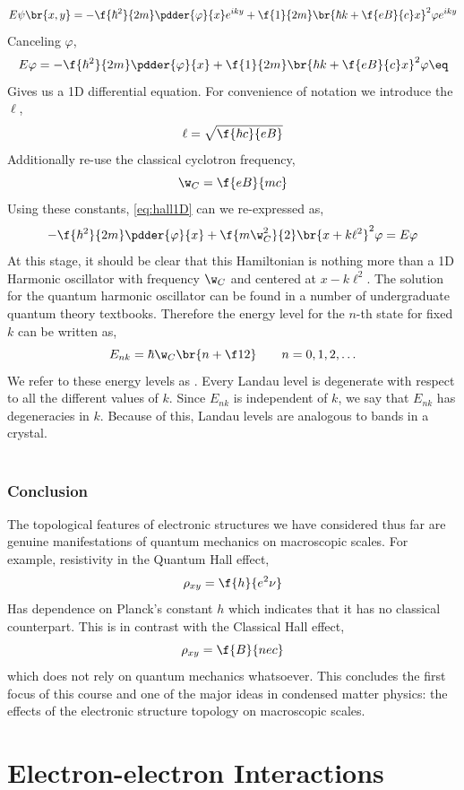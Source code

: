 \documentclass{article}
\begin{document}
\[ E \psi\br{x,y}= - \f{\hbar^2}{2m} \pdder{\varphi}{x} e^{iky} + \f{1}{2m}\br{\hbar k + \f{eB}{c}x}^2 \varphi e^{iky} \]
Canceling $\varphi$,
\[ E \varphi = - \f{\hbar^2}{2m} \pdder{\varphi}{x} + \f{1}{2m}\br{\hbar k + \f{eB}{c}x}^2 \varphi \eq \label{eq:hall1D}\]
Gives us a 1D differential equation. For convenience of notation we introduce the  $\ell$,
\[ \ell = \sqrt{\f{\hbar c}{eB}} \]
Additionally re-use the classical cyclotron frequency,
\[ \w_{C} = \f{eB}{mc} \]
Using these constants, \cref{eq:hall1D} can we re-expressed as,
\[ -\f{\hbar^2}{2m} \pdder{\varphi}{x} + \f{m\w_{C}^2}{2} \br{x + k \ell^{2}}^2 \varphi = E \varphi \]
At this stage, it should be clear that this Hamiltonian is nothing more than a 1D Harmonic oscillator with frequency $\w_{C}$ and centered at $x - k \ell^{2}$. The solution for the quantum harmonic oscillator can be found in a number of undergraduate quantum theory textbooks. Therefore the energy level for the $n$-th state for fixed $k$ can be written as,
\[ E_{nk} = \hbar \w_{C} \br{n + \f12} \qquad n = 0, 1, 2, \ldots \]
We refer to these energy levels as . Every Landau level is degenerate with respect to all the different values of $k$. Since $E_{nk}$ is independent of $k$, we say that $E_{nk}$ has degeneracies in $k$. Because of this, Landau levels are analogous to bands in a crystal. \\

 \\

\subsubsection{Conclusion}

The topological features of electronic structures we have considered thus far are genuine manifestations of quantum mechanics on macroscopic scales. For example, resistivity in the Quantum Hall effect,
\[ \rho_{xy} = \f{h}{e^2 \nu} \]
Has dependence on Planck's constant $h$ which indicates that it has no classical counterpart. This is in contrast with the Classical Hall effect,
\[ \rho_{xy} = \f{B}{nec} \]
which does not rely on quantum mechanics whatsoever. This concludes the first focus of this course and one of the major ideas in condensed matter physics: the effects of the electronic structure topology on macroscopic scales. \\

\section{Electron-electron Interactions}
\end{document}
